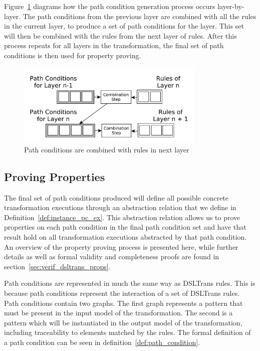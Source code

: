 Figure~\ref{fig:next_layer2} diagrams how the path condition generation process occurs layer-by-layer. The path conditions from the previous layer are combined with all the rules in the current layer, to produce a set of path conditions for the layer. This set will then be combined with the rules from the next layer of rules. After this process repeats for all layers in the transformation, the final set of path conditions is then used for property proving.

\begin{figure}[htb]
              
        \centering
        \includegraphics[width=0.8\textwidth]{./figures/building_path_conditions/next_layer.pdf}
        \caption{Path conditions are combined with rules in next layer}
        \label{fig:next_layer2}
\end{figure}

 
 
\subsection{Proving Properties}

The final set of path conditions produced will define all possible concrete transformation executions through an abstraction relation that we define in Definition~\ref{def:instance_pc_ex}. This abstraction relation allows us to prove properties on each path condition in the final path condition set and have that result hold on all transformation executions abstracted by that path condition. An overview of the property proving process is presented here, while further details as well as formal validity and completeness proofs are found in section~\ref{sec:verif_dsltrans_props}.

Path conditions are represented in much the same way as DSLTrans rules. This is because path conditions represent the interaction of a set of DSLTrans rules. Path conditions contain two graphs. The first graph represents a pattern that must be present in the input model of the transformation. The second is a pattern which will be instantiated in the output model of the transformation, including traceability to elements matched by the rules. The formal definition of a path condition can be seen in definition~\ref{def:path_condition}.

